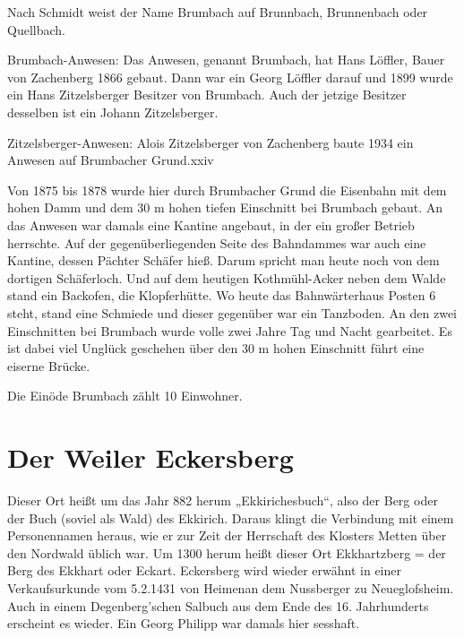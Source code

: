 \documentclass{book}
\begin{document}
Nach Schmidt weist der Name Brumbach auf Brunnbach, Brunnenbach oder Quellbach.

Brumbach-Anwesen: Das Anwesen, genannt Brumbach, hat Hans Löffler, Bauer von
Zachenberg 1866 gebaut. Dann war ein Georg Löffler darauf und 1899 wurde ein
Hans Zitzelsberger Besitzer von Brumbach. Auch der jetzige Besitzer desselben
ist ein Johann Zitzelsberger.

Zitzelsberger-Anwesen: Alois Zitzelsberger von Zachenberg baute 1934 ein Anwesen
auf Brumbacher Grund.xxiv

Von 1875 bis 1878 wurde hier durch Brumbacher Grund die Eisenbahn mit dem hohen
Damm und dem 30 m hohen tiefen Einschnitt bei Brumbach gebaut. An das Anwesen
war damals eine Kantine angebaut, in der ein großer Betrieb herrschte. Auf der
gegenüberliegenden Seite des Bahndammes war auch eine Kantine, dessen Pächter
Schäfer hieß. Darum spricht man heute noch von dem dortigen Schäferloch. Und auf
dem heutigen Kothmühl-Acker neben dem Walde stand ein Backofen, die
Klopferhütte. Wo heute das Bahnwärterhaus Posten 6 steht, stand eine Schmiede
und dieser gegenüber war ein Tanzboden. An den zwei Einschnitten bei Brumbach
wurde volle zwei Jahre Tag und Nacht gearbeitet. Es ist dabei viel Unglück
geschehen über den 30 m hohen Einschnitt führt eine eiserne Brücke.

Die Einöde Brumbach zählt 10 Einwohner.

\section{Der Weiler Eckersberg}

Dieser Ort heißt um das Jahr 882 herum „Ekkirichesbuch“, also der Berg oder der
Buch (soviel als Wald) des Ekkirich. Daraus klingt die Verbindung mit einem
Personennamen heraus, wie er zur Zeit der Herrschaft des Klosters Metten über
den Nordwald üblich war. Um 1300 herum heißt dieser Ort Ekkhartzberg = der Berg
des Ekkhart oder Eckart. Eckersberg wird wieder erwähnt in einer Verkaufsurkunde
vom 5.2.1431 von Heimenan dem Nussberger zu Neueglofsheim. Auch in einem
Degenberg'schen Salbuch aus dem Ende des 16. Jahrhunderts erscheint es wieder.
Ein Georg Philipp war damals hier sesshaft.
\end{document}
